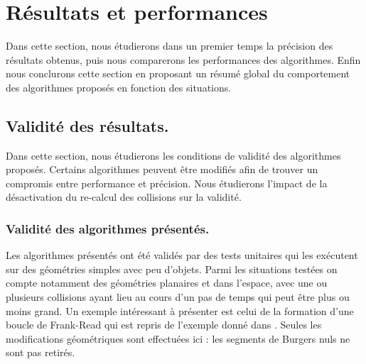 \documentclass[11pt,class=article,float=false,crop=false]{standalone}
\begin{document}
\section{Résultats et performances}

Dans cette section, nous étudierons dans un premier temps la précision des résultats obtenus, puis nous comparerons les performances des algorithmes. Enfin nous conclurons cette section en proposant un résumé global du comportement des algorithmes proposés en fonction des situations.

\subsection{ Validité des résultats. }

Dans cette section, nous étudierons les conditions de validité des algorithmes proposés. Certains algorithmes peuvent être modifiés afin de trouver un compromis entre performance et précision. Nous étudierons l'impact de la désactivation du re-calcul des collisions sur la validité.

\subsubsection{ Validité des algorithmes présentés. }

Les algorithmes présentés ont été validés par des tests unitaires qui les exécutent sur des géométries simples avec peu d'objets. Parmi les situations testées on compte notamment des géométries planaires et dans l'espace, avec une ou plusieurs collisions ayant lieu au cours d'un pas de temps qui peut être plus ou moins grand. Un exemple intéressant à présenter est celui de la formation d'une boucle de Frank-Read qui est repris de l'exemple donné dans . Seules les modifications géométriques sont effectuées ici : les segments de Burgers nuls ne sont pas retirés.
\end{document}
